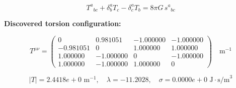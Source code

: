 
\begin{equation}
  T^a{}_{bc} + \delta^a_b T_c - \delta^a_c T_b = 8\pi G \, s^a{}_{bc}
\end{equation}

\textbf{Discovered torsion configuration:}

\begin{equation}
  T^{\mu\nu} = \begin{pmatrix}
    0 & 0.981051 & -1.000000 & -1.000000 \\
    -0.981051 & 0 & 1.000000 & 1.000000 \\
    1.000000 & -1.000000 & 0 & -1.000000 \\
    1.000000 & -1.000000 & 1.000000 & 0
  \end{pmatrix} \quad \text{m}^{-1}
\end{equation}

\begin{equation}
  |T| = 2.4418e+0 \text{ m}^{-1}, \quad
  \lambda = -11.2028, \quad
  \sigma = 0.0000e+0 \text{ J}\cdot\text{s/m}^3
\end{equation}